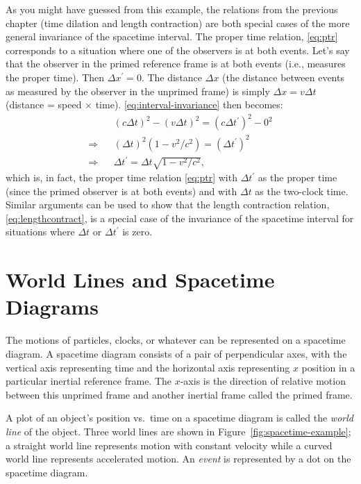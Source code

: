 As you might have guessed from this example, the relations from the
previous chapter (time dilation and length contraction) are both
special cases of the more general invariance of the spacetime
interval.  The proper time relation, \eqref{eq:ptr} corresponds to
a situation where one of the observers is at both events.  Let's say
that the observer in the primed reference frame is at both events
(i.e., measures the proper time).  Then $\Delta x^\prime = 0$.  The
distance $\Delta x$ (the distance between events as measured by the observer
in the unprimed frame) is simply $\Delta x = v\Delta t$ 
(distance = speed $\times$ time).
\eqref{eq:interval-invariance} then becomes:
\begin{eqnarray}
&&\left(c\Delta t\right)^2 - \left(v\Delta t\right)^2 = 
       \left(c\Delta t^\prime\right)^2 -  0^2  \\
\Rightarrow &&\left(\Delta t\right)^2\left(1-v^2/c^2\right) = 
       \left(\Delta t^\prime\right)^2  \\
\Rightarrow &&\Delta t^\prime = \Delta t\sqrt{1-v^2/c^2},  
\end{eqnarray}
which is, in fact, the proper time relation \eqref{eq:ptr} with
$\Delta t^\prime$ as the proper time (since the primed observer is at
both events) and with $\Delta t$ as the two-clock time.  Similar
arguments can be used to show that the length contraction relation,
\eqref{eq:lengthcontract}, is a special case of the invariance of
the spacetime interval for situations where $\Delta t$ or $\Delta
t^\prime$ is zero.

\section{World Lines and Spacetime Diagrams}
\label{sec:worldlines}

The motions of particles, clocks, or whatever can be represented on a
spacetime diagram.  A spacetime diagram consists of a pair of
perpendicular axes, with the vertical axis representing time and the
horizontal axis representing $x$ position in a particular inertial
reference frame.  The $x$-axis is the direction of relative motion
between this unprimed frame and another inertial frame called the
primed frame.
    
A plot of an object's position vs.\ time on a spacetime diagram is
called the \emph{world line} of the object.  Three world lines are
shown in Figure~\ref{fig:spacetime-example}; a straight world line
represents motion with constant velocity while a curved world line
represents accelerated motion.  An \emph{event} is represented by a dot
on the spacetime diagram.
    
